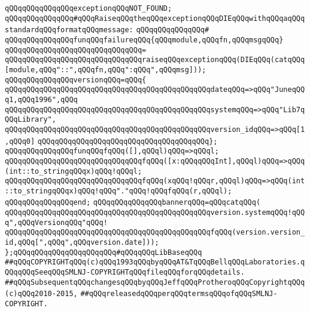 \verb|qQQqqQQqqQQqqQQqexceptionqQQqNOT_FOUND;|\newline
\newline
\verb|qQQqqQQqqQQqqQQq#qQQqRaiseqQQqtheqQQqexceptionqQQqDIEqQQqwithqQQqaqQQqstandardqQQqformatqQQqmessage:|\newline
\verb|qQQqqQQqqQQqqQQq#|\newline
\verb|qQQqqQQqqQQqqQQqfunqQQqfailureqQQq{qQQqmodule,qQQqfn,qQQqmsgqQQq}|\newline
\verb|qQQqqQQqqQQqqQQqqQQqqQQqqQQqqQQq=|\newline
\verb|qQQqqQQqqQQqqQQqqQQqqQQqqQQqqQQqraiseqQQqexceptionqQQq(DIEqQQq(catqQQq[module,qQQq"::",qQQqfn,qQQq":qQQq",qQQqmsg]));|\newline
\newline
\verb|qQQqqQQqqQQqqQQqversionqQQq=qQQq{|\newline
\verb|qQQqqQQqqQQqqQQqqQQqqQQqqQQqqQQqqQQqqQQqqQQqqQQqdateqQQq=>qQQq"JuneqQQq1,qQQq1996",qQQq|\newline
\verb|qQQqqQQqqQQqqQQqqQQqqQQqqQQqqQQqqQQqqQQqqQQqqQQqsystemqQQq=>qQQq"Lib7qQQqLibrary",|\newline
\verb|qQQqqQQqqQQqqQQqqQQqqQQqqQQqqQQqqQQqqQQqqQQqqQQqversion_idqQQq=>qQQq[1,qQQq0]|\newline
\verb|qQQqqQQqqQQqqQQqqQQqqQQqqQQqqQQqqQQqqQQq};|\newline
\newline
\verb|qQQqqQQqqQQqqQQqfunqQQqfqQQq([],qQQql)qQQq=>qQQql;|\newline
\verb|qQQqqQQqqQQqqQQqqQQqqQQqqQQqqQQqfqQQq([x:qQQqqQQqInt],qQQql)qQQq=>qQQq(int::to_stringqQQqx)qQQq!qQQql;|\newline
\verb|qQQqqQQqqQQqqQQqqQQqqQQqqQQqqQQqfqQQq(xqQQq!qQQqr,qQQql)qQQq=>qQQq(int::to_stringqQQqx)qQQq!qQQq"."qQQq!qQQqfqQQq(r,qQQql);|\newline
\verb|qQQqqQQqqQQqqQQqend;|\newline
\newline
\verb|qQQqqQQqqQQqqQQqbannerqQQq=qQQqcatqQQq(|\newline
\verb|qQQqqQQqqQQqqQQqqQQqqQQqqQQqqQQqqQQqqQQqqQQqqQQqversion.systemqQQq!qQQq",qQQqVersionqQQq"qQQq!|\newline
\verb|qQQqqQQqqQQqqQQqqQQqqQQqqQQqqQQqqQQqqQQqqQQqqQQqfqQQq(version.version_id,qQQq[",qQQq",qQQqversion.date]));|\newline
\newline
\verb|};qQQqqQQqqQQqqQQqqQQqqQQq#qQQqqQQqLibBaseqQQq|\newline
\newline
\newline
\newline
\verb|##qQQqCOPYRIGHTqQQq(c)qQQq1993qQQqbyqQQqAT&TqQQqBellqQQqLaboratories.qQQqqQQqSeeqQQqSMLNJ-COPYRIGHTqQQqfileqQQqforqQQqdetails.|\newline
\verb|##qQQqSubsequentqQQqchangesqQQqbyqQQqJeffqQQqProtheroqQQqCopyrightqQQq(c)qQQq2010-2015,|\newline
\verb|##qQQqreleasedqQQqperqQQqtermsqQQqofqQQqSMLNJ-COPYRIGHT.|\newline

